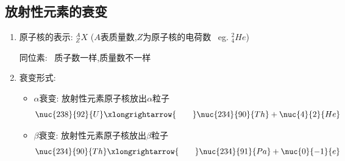 \documentclass{article}
\begin{document}
\vspace{2em}

\subsection{放射性元素的衰变}
\begin{enumerate}
    \item 原子核的表示: $_{Z}^{A}X$ \quad ($A$表质量数,$Z$为原子核的电荷数 \, eg. $_{4}^{2}He$)
    
    \vspace{-1em}
    \begin{adjustbox}{minipage=0.32\linewidth, bgcolor=gray!20, padding=1em}
        \small 
        同位素: \, 质子数一样,质量数不一样
    \end{adjustbox}
    \vspace{-1em}

    \item 衰变形式:
    \begin{itemize}
        \item[] $\alpha$衰变: 放射性元素原子核放出$\alpha$粒子
        $$
        \nuc{238}{92}{U} \xlongrightarrow{\quad\quad} \nuc{234}{90}{Th}  + \nuc{4}{2}{He}
        $$ 
        \item[] $\beta$衰变: 放射性元素原子核放出$\beta$粒子
        $$
        \nuc{234}{90}{Th} \xlongrightarrow{\quad\quad}  \nuc{234}{91}{Pa}+ \nuc{0}{-1}{e}
        $$ 
    \end{itemize}
\end{enumerate}
\end{document}

